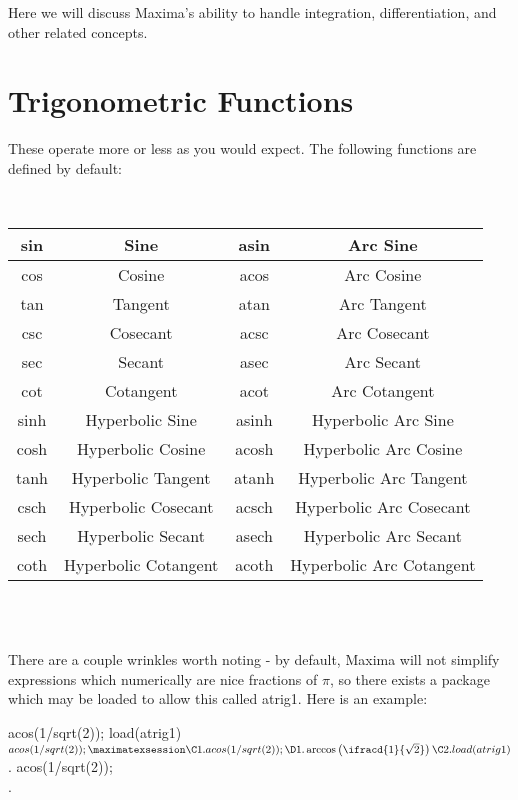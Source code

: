 
Here we will discuss Maxima's ability to handle integration, 
differentiation, and other related concepts.

\section{Trigonometric Functions}

These operate more or less as you would expect.  The following functions
are defined by default:

~

{\center \begin{tabular}{|c|c|c|c|}
\hline 
sin&
Sine&
asin&
Arc Sine\\
\hline
cos&
Cosine&
acos&
Arc Cosine\\
\hline 
tan&
Tangent&
atan&
Arc Tangent\\
\hline 
csc&
Cosecant&
acsc&
Arc Cosecant\\
\hline 
sec&
Secant&
asec&
Arc Secant\\
\hline 
cot&
Cotangent&
acot&
Arc Cotangent\\
\hline 
sinh&
Hyperbolic Sine&
asinh&
Hyperbolic Arc Sine\\
\hline 
cosh&
Hyperbolic Cosine&
acosh&
Hyperbolic Arc Cosine\\
\hline 
tanh&
Hyperbolic Tangent&
atanh&
Hyperbolic Arc Tangent\\
\hline 
csch&
Hyperbolic Cosecant&
acsch&
Hyperbolic Arc Cosecant\\
\hline 
sech&
Hyperbolic Secant&
asech&
Hyperbolic Arc Secant\\
\hline 
coth&
Hyperbolic Cotangent&
acoth&
Hyperbolic Arc Cotangent\\
\hline
\end{tabular} \par}

~\\

~

There are a couple wrinkles worth noting - by default, Maxima will not
simplify expressions which numerically are nice fractions of $\pi$, so
there exists a package which may be loaded to allow this called
atrig1.  Here is an example:

\beginmaximasession
acos(1/sqrt(2));
load(atrig1)$
acos(1/sqrt(2));
\maximatexsession
\C1.  acos(1/sqrt(2)); \\
\D1.  \arccos \left(\ifracd{1}{\sqrt{2}}\right) \\
\C2.  load(atrig1)$ \\
.  acos(1/sqrt(2)); \\
.   \\
\endmaximasession

